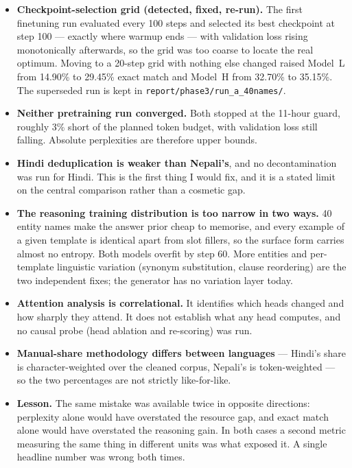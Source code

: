 \documentclass[10pt]{article}
\begin{document}
\begin{itemize}
\item \textbf{Checkpoint-selection grid (detected, fixed, re-run).} The first
finetuning run evaluated every 100 steps and selected its best checkpoint at step
100 --- exactly where warmup ends --- with validation loss rising monotonically
afterwards, so the grid was too coarse to locate the real optimum. Moving to a
20-step grid with nothing else changed raised Model~L from 14.90\% to 29.45\% exact
match and Model~H from 32.70\% to 35.15\%. The superseded run is kept in
\texttt{report/phase3/run\_a\_40names/}.
\item \textbf{Neither pretraining run converged.} Both stopped at the 11-hour guard,
roughly 3\% short of the planned token budget, with validation loss still falling.
Absolute perplexities are therefore upper bounds.
\item \textbf{Hindi deduplication is weaker than Nepali's}, and no decontamination was
run for Hindi. This is the first thing I would fix, and it is a stated limit on the
central comparison rather than a cosmetic gap.
\item \textbf{The reasoning training distribution is too narrow in two ways.} 40 entity
names make the answer prior cheap to memorise, and every example of a given template
is identical apart from slot fillers, so the surface form carries almost no entropy.
Both models overfit by step 60. More entities and per-template linguistic variation
(synonym substitution, clause reordering) are the two independent fixes; the generator
has no variation layer today.
\item \textbf{Attention analysis is correlational.} It identifies which heads changed
and how sharply they attend. It does not establish what any head computes, and no
causal probe (head ablation and re-scoring) was run.
\item \textbf{Manual-share methodology differs between languages} --- Hindi's share is
character-weighted over the cleaned corpus, Nepali's is token-weighted --- so the two
percentages are not strictly like-for-like.
\item \textbf{Lesson.} The same mistake was available twice in opposite directions:
perplexity alone would have overstated the resource gap, and exact match alone would
have overstated the reasoning gain. In both cases a second metric measuring the same
thing in different units was what exposed it. A single headline number was wrong both
times.
\end{itemize}
\end{document}
